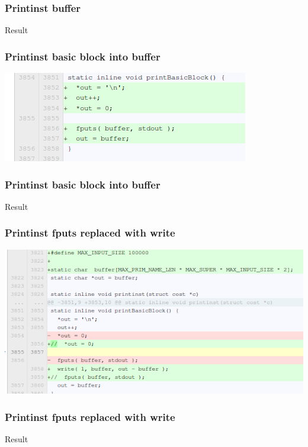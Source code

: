 \documentclass{beamer}
\begin{document}
\begin{frame}\frametitle{Printinst buffer}
\begin{center}
Result
\end{center}
\end{frame}

\begin{frame}\frametitle{Printinst basic block into buffer}
\begin{center}
\includegraphics[scale=0.4]{shots/printinst2.png}
\end{center}
\end{frame}

\begin{frame}\frametitle{Printinst basic block into buffer}
\begin{center}
Result
\end{center}
\end{frame}

\begin{frame}\frametitle{Printinst fputs replaced with write}
\begin{center}
\includegraphics[scale=0.4]{shots/printinst3.png}
\end{center}
\end{frame}

\begin{frame}\frametitle{Printinst fputs replaced with write}
\begin{center}
Result
\end{center}
\end{frame}
\end{document}

